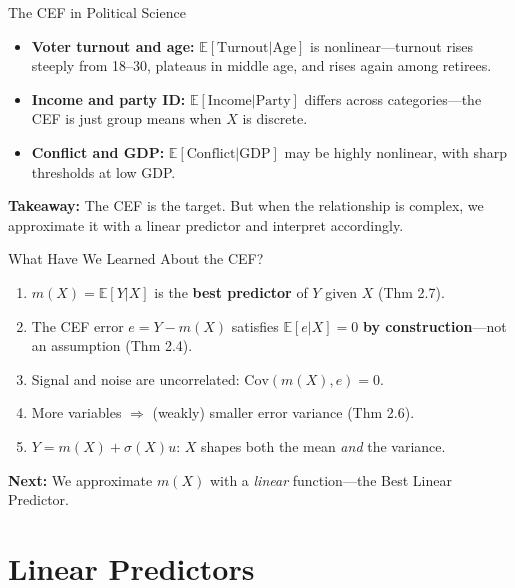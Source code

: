 \documentclass[aspectratio=169, handout, t]{beamer}
\numberwithin{equation}{section}
\begin{document}
\begin{frame}{The CEF in Political Science}
\begin{itemize}
\item \textbf{Voter turnout and age:} $\mathbb{E}[\text{Turnout}|\text{Age}]$ is nonlinear---turnout rises steeply from 18--30, plateaus in middle age, and rises again among retirees.\pause
\item \textbf{Income and party ID:} $\mathbb{E}[\text{Income}|\text{Party}]$ differs across categories---the CEF is just group means when $X$ is discrete.\pause
\item \textbf{Conflict and GDP:} $\mathbb{E}[\text{Conflict}|\text{GDP}]$ may be highly nonlinear, with sharp thresholds at low GDP.
\end{itemize}
\bigskip
\textbf{Takeaway:} The CEF is the target. But when the relationship is complex, we approximate it with a linear predictor and interpret accordingly.
\end{frame}

\begin{frame}{What Have We Learned About the CEF?}
\begin{tcolorbox}[colback=blue!5, colframe=blue!50, title=CEF Summary]
\begin{enumerate}
\item $m(X)=\mathbb{E}[Y|X]$ is the \textbf{best predictor} of $Y$ given $X$ (Thm 2.7).
\item The CEF error $e=Y-m(X)$ satisfies $\mathbb{E}[e|X]=0$ \textbf{by construction}---not an assumption (Thm 2.4).
\item Signal and noise are uncorrelated: $\text{Cov}(m(X), e)=0$.
\item More variables $\Rightarrow$ (weakly) smaller error variance (Thm 2.6).
\item $Y = m(X) + \sigma(X)u$: $X$ shapes both the mean \emph{and} the variance.
\end{enumerate}
\end{tcolorbox}
\medskip
\textbf{Next:} We approximate $m(X)$ with a \emph{linear} function---the Best Linear Predictor.
\end{frame}

\section{Linear Predictors}
\end{document}
